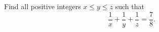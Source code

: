 Find all positive integers $x\le y\le z$ such that
\[
\dfrac{1}{x}+\dfrac{1}{y}+\dfrac{1}{z}=\dfrac{7}{8} .
\]
